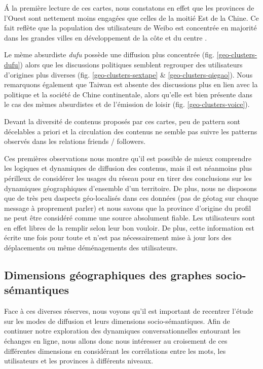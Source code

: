 \'A la premi\`ere lecture de ces cartes, nous constatons en effet que les provinces de l{\textquoteright}Ouest sont nettement moins engag\'ees que celles de la moiti\'e Est de la Chine. Ce fait refl\`ete que la population des utilisateurs de Weibo est concentr\'ee en majorit\'e dans les grandes villes en d\'eveloppement de la c\^ote et du centre \cite{Fu2013}.  

Le m\`eme absurdiste \textit{dufu} poss\`ede une diffusion plus concentr\'ee (fig. \ref{geo-clusters-dufu}) alors que les discussions politiques semblent regrouper des utilisateurs d{\textquoteright}origines plus diverses (fig. \ref{geo-clusters-sextape} \& \ref{geo-clusters-qiegao}). Nous remarquons \'egalement que Taiwan est absente des discussions plus en lien avec la politique et la soci\'et\'e de Chine continentale, alors qu{\textquoteright}elle est bien pr\'esente dans le cas des m\`emes absurdistes et de l{\textquoteright}\'emission de loisir (fig. \ref{geo-clusters-voice}).  

Devant la diversit\'e de contenus propos\'es par ces cartes, peu de pattern sont d\'ecelables a priori et la circulation des contenus ne semble pas suivre les patterns observ\'es dans les relations friends / followers. 

Ces premi\`eres observations nous montre qu{\textquoteright}il est possible de mieux comprendre les logiques et dynamiques de diffusion des contenus, mais il est n\'eanmoins plus p\'erilleux de consid\'erer les usages du r\'eseau pour en tirer des conclusions sur les dynamiques g\'eographiques d{\textquoteright}ensemble d{\textquoteright}un territoire. De plus, nous ne disposons que de tr\`es peu d{\textquotesingle}aspects {\textquotedbl}g\'eo-localis\'es{\textquotedbl} dans ces donn\'ees (pas de g\'eotag sur chaque message \`a proprement parler) et nous savons que la province d{\textquoteright}origine du profil ne peut \^etre consid\'er\'e comme une source absolument fiable. Les utilisateurs sont en effet libres de la remplir selon leur bon vouloir. De plus, cette information est \'ecrite une fois pour toute et n{\textquoteright}est pas n\'ecessairement mise \`a jour lors des d\'eplacements ou m\^eme d\'em\'enagements des utilisateurs. 

\subsection{Dimensions g\'eographiques des graphes socio-s\'emantiques}

Face \`a ces diverses r\'eserves, nous voyons qu{\textquoteright}il est important de recentrer l{\textquoteright}\'etude sur les modes de diffusion et leurs dimensions socio-s\'emantiques. Afin de continuer notre exploration des dynamiques conversationnelles entourant les \'echanges en ligne, nous allons donc nous int\'eresser au croisement de ces diff\'erentes dimensions en consid\'erant les corr\'elations entre les mots, les utilisateurs et les provinces \`a diff\'erents niveaux. 

